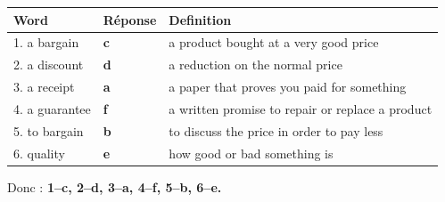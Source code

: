 \documentclass[11pt]{article}
\begin{document}
\begin{corrige}
\begin{center}
\begin{tabular}{|l|l|l|}
\hline
\rowcolor{popblueL} \textbf{Word} & \textbf{Réponse} & \textbf{Definition} \\
\hline
1. a bargain & \textbf{c} & a product bought at a very good price \\
2. a discount & \textbf{d} & a reduction on the normal price \\
3. a receipt & \textbf{a} & a paper that proves you paid for something \\
4. a guarantee & \textbf{f} & a written promise to repair or replace a product \\
5. to bargain & \textbf{b} & to discuss the price in order to pay less \\
6. quality & \textbf{e} & how good or bad something is \\
\hline
\end{tabular}
\end{center}
Donc : \textbf{1–c, 2–d, 3–a, 4–f, 5–b, 6–e.}
\end{corrige}
\end{document}
